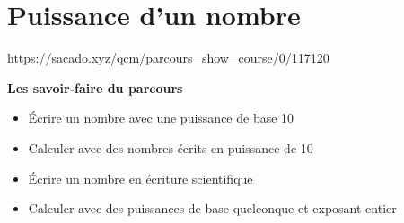 \chapter{Puissance d'un nombre}
{https://sacado.xyz/qcm/parcours_show_course/0/117120}
{ 

 \begin{CpsCol}
 \textbf{Les savoir-faire du parcours} 
 \begin{itemize}
\item Écrire un nombre avec une puissance de base 10
\item Calculer avec des nombres écrits en puissance de 10
\item Écrire un nombre en écriture scientifique
\item Calculer avec des puissances de base quelconque et exposant entier
 \end{itemize}
 \end{CpsCol}
}
%
%
% 
%
% 
%



